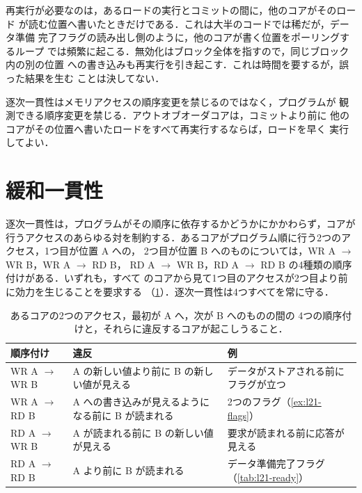 \documentclass[../main.tex]{subfiles}
\begin{document}
再実行が必要なのは，あるロードの実行とコミットの間に，他のコアがそのロード
が読む位置へ書いたときだけである．これは大半のコードでは稀だが，データ準備
完了フラグの読み出し側のように，他のコアが書く位置をポーリングするループ
では頻繁に起こる．無効化はブロック全体を指すので，同じブロック内の別の位置
への書き込みも再実行を引き起こす．これは時間を要するが，誤った結果を生む
ことは決してない．

\begin{keypoint}
  逐次一貫性はメモリアクセスの順序変更を禁じるのではなく，プログラムが
  観測できる順序変更を禁じる．アウトオブオーダコアは，コミットより前に
  他のコアがその位置へ書いたロードをすべて再実行するならば，ロードを早く
  実行してよい．
\end{keypoint}

\section{緩和一貫性}
\label{sec:l21-relaxed}

逐次一貫性は，プログラムがその順序に依存するかどうかにかかわらず，コアが
行うアクセスのあらゆる対を制約する．あるコアがプログラム順に行う2つのアクセス，1つ目が位置 A への，
2つ目が位置 B へのものについては，WR A $\to$ WR B，WR A $\to$ RD B，
RD A $\to$ WR B，RD A $\to$ RD B の4種類の順序付けがある．いずれも，すべて
のコアから見て1つ目のアクセスが2つ目より前に効力を生じることを要求する
（\cref{tab:l21-orderings}）．逐次一貫性は4つすべてを常に守る．

\begin{table}[htbp]
  \centering\small
  \caption{あるコアの2つのアクセス，最初が A へ，次が B へのものの間の
    4つの順序付けと，それらに違反するコアが起こしうること．}
  \label{tab:l21-orderings}
  \begin{tabular}{@{}lp{4.3cm}p{4.1cm}@{}}
    \toprule
    順序付け & 違反 & 例 \\
    \midrule
    WR A $\to$ WR B & A の新しい値より前に B の新しい値が見える
      & データがストアされる前にフラグが立つ \\
    WR A $\to$ RD B & A への書き込みが見えるようになる前に B が読まれる
      & 2つのフラグ（\cref{ex:l21-flags}） \\
    RD A $\to$ WR B & A が読まれる前に B の新しい値が見える
      & 要求が読まれる前に応答が見える \\
    RD A $\to$ RD B & A より前に B が読まれる
      & データ準備完了フラグ（\cref{tab:l21-ready}） \\
    \bottomrule
  \end{tabular}
\end{table}
\end{document}
